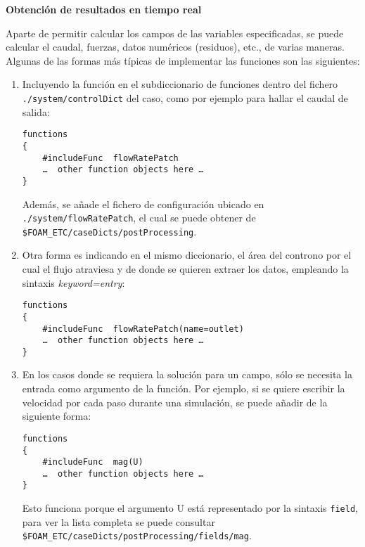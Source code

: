 \textbf{Obtención de resultados en tiempo real}

Aparte de permitir calcular los campos de las variables especificadas,
se puede calcular el caudal, fuerzas, datos numéricos (residuos), etc.,
de varias maneras. Algunas de las formas más típicas de implementar las
funciones son las siguientes:

\begin{enumerate}
\def\labelenumi{\arabic{enumi}.}
\item
  Incluyendo la función en el subdiccionario de funciones dentro del
  fichero \lstinline[style=bash]{./system/controlDict} del caso, como
  por ejemplo para hallar el caudal de salida:

\begin{lstlisting}[style=c++]
functions
{
    #includeFunc  flowRatePatch
    …  other function objects here …
}
\end{lstlisting}

  Además, se añade el fichero de configuración ubicado en
  \lstinline[style=bash]{./system/flowRatePatch}, el cual se puede
  obtener de
  \lstinline[style=bash]{$FOAM_ETC/caseDicts/postProcessing}.
\item
  Otra forma es indicando en el mismo diccionario, el área del controno
  por el cual el flujo atraviesa y de donde se quieren extraer los
  datos, empleando la sintaxis \emph{keyword=entry}:

\begin{lstlisting}[style=c++]
functions
{
    #includeFunc  flowRatePatch(name=outlet)
    …  other function objects here …
}
\end{lstlisting}

\item
  En los casos donde se requiera la solución para un campo, sólo se
  necesita la entrada como argumento de la función. Por ejemplo, si se
  quiere escribir la velocidad por cada paso durante una simulación, se
  puede añadir de la siguiente forma:

\begin{lstlisting}[style=c++]
functions
{
    #includeFunc  mag(U)
    …  other function objects here …
}
\end{lstlisting}

  Esto funciona porque el argumento U está representado por la sintaxis
  \texttt{field}, para ver la lista completa se puede consultar
  \lstinline[style=bash]{$FOAM_ETC/caseDicts/postProcessing/fields/mag}.
\end{enumerate}

